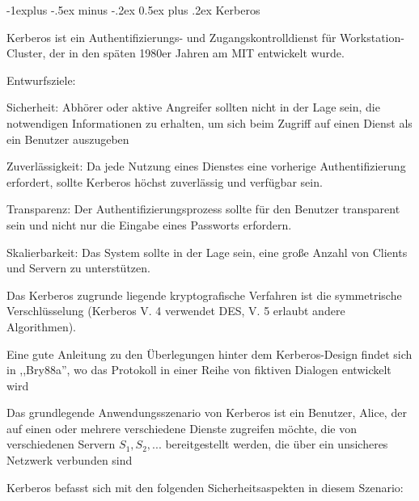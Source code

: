 \documentclass[a4paper]{article}
\makeatletter
\renewcommand{\subsection}{\@startsection{subsection}{2}{0mm}%
 {-1explus -.5ex minus -.2ex}%
 {0.5ex plus .2ex}%
 {\normalfont\normalsize\bfseries}}
\makeatother
\begin{document}
\begin{multicols}{3}
      \subsection{Kerberos}

      \begin{itemize*}
            \item Kerberos ist ein Authentifizierungs- und Zugangskontrolldienst für
            Workstation-Cluster, der in den späten 1980er Jahren am MIT entwickelt
            wurde.
            \item Entwurfsziele:
            \begin{itemize*}
                  \item Sicherheit: Abhörer oder aktive Angreifer sollten nicht in der Lage sein, die notwendigen Informationen zu erhalten, um sich beim Zugriff auf einen Dienst als ein Benutzer auszugeben
                  \item Zuverlässigkeit: Da jede Nutzung eines Dienstes eine vorherige Authentifizierung erfordert, sollte Kerberos höchst zuverlässig und verfügbar sein.
                  \item Transparenz: Der Authentifizierungsprozess sollte für den Benutzer transparent sein und nicht nur die Eingabe eines Passworts erfordern.
                  \item Skalierbarkeit: Das System sollte in der Lage sein, eine große Anzahl von Clients und Servern zu unterstützen.
            \end{itemize*}
            \item Das Kerberos zugrunde liegende kryptografische Verfahren ist die
            symmetrische Verschlüsselung (Kerberos V. 4 verwendet DES, V. 5
            erlaubt andere Algorithmen).
            \item Eine gute Anleitung zu den Überlegungen hinter dem Kerberos-Design
            findet sich in ,,Bry88a'', wo das Protokoll in einer Reihe von
            fiktiven Dialogen entwickelt wird
            \item Das grundlegende Anwendungsszenario von Kerberos ist ein Benutzer,
            Alice, der auf einen oder mehrere verschiedene Dienste zugreifen
            möchte, die von verschiedenen Servern $S_1, S_2, ...$
            bereitgestellt werden, die über ein unsicheres Netzwerk verbunden sind
            \item Kerberos befasst sich mit den folgenden Sicherheitsaspekten in diesem
            Szenario:
            \begin{itemize*}

\end{itemize*}
\end{itemize*}
\end{multicols}
\end{document}
